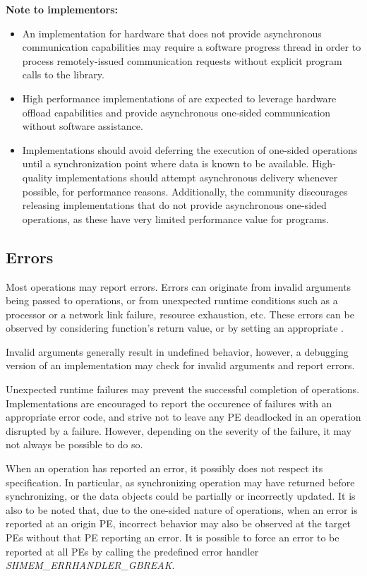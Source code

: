 \textbf{Note to implementors:}
\begin{itemize}
  \item An \openshmem implementation for hardware that does not provide
      asynchronous communication capabilities may require a software progress
      thread in order to process remotely-issued communication requests without
      explicit program calls to the \openshmem library.  
  \item High performance implementations of \openshmem are expected to leverage
      hardware offload capabilities and provide asynchronous one-sided
      communication without software assistance.
  \item Implementations should avoid deferring the execution of one-sided
      operations until a synchronization point where data is known to be
      available. High-quality implementations should attempt asynchronous delivery
      whenever possible, for performance reasons. Additionally, the \openshmem
      community discourages releasing \openshmem implementations that do not
      provide asynchronous one-sided operations, as these have very limited
      performance value for \openshmem programs.
\end{itemize}

\subsection{Errors}\label{sec:errors}

Most \openshmem operations may report errors. Errors can originate from 
invalid arguments being passed to \openshmem operations, or from 
unexpected runtime conditions such as a processor or a network link 
failure, resource exhaustion, etc. These errors can be observed by 
considering \openshmem function's return value, or by setting an 
appropriate . 

Invalid arguments generally result in undefined behavior, however, a 
debugging version of an \openshmem implementation may check for invalid 
arguments and report errors.

Unexpected runtime failures may prevent the successful completion of \openshmem operations.
Implementations are encouraged to report the occurence of failures with an 
appropriate error code, and strive not to leave any \ac{PE} deadlocked in 
an operation disrupted by a failure. However, depending on the severity of 
the failure, it may not always be possible to do so.

When an \openshmem operation has reported an error, it possibly does
not respect its specification. In particular, as synchronizing operation may 
have returned before synchronizing, or the data objects could be partially 
or incorrectly updated. It is also to be noted that, due to the one-sided
nature of \openshmem operations, when an error is reported at 
an origin \ac{PE}, incorrect behavior may also be observed at
the target \acp{PE} without that \ac{PE} reporting an error. It is possible 
to force an error to be reported at all \acp{PE} by calling the predefined
error handler \textit{SHMEM\_ERRHANDLER\_GBREAK}.

